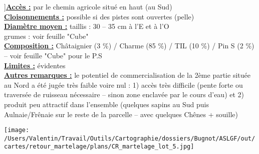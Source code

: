 \documentclass[a4paper,openany]{book}\usepackage[]{graphicx}\usepackage[]{color}
\begin{document}
\begin{multicols}{2}
]\noindent\textbf{\underline{Accès :}} par le chemin agricole situé en haut (au Sud)\vspace{0.1cm} \\\noindent\textbf{\underline{Cloisonnements :}} possible si des pistes sont ouvertes (pelle)\vspace{0.1cm} \\\noindent\textbf{\underline{Diamètre moyen :}} taillis : 30 -- 35 cm à l'E et à l'O \\ grumes : voir feuille "Cube"\vspace{0.1cm} \\\noindent\textbf{\underline{Composition :}} Châtaignier (3 \%) / Charme (85 \%) / TIL (10 \%) / Pin S (2 \%) -- voir feuille "Cube" pour le P.S\vspace{0.1cm} \\\noindent\textbf{\underline{Limites :}} évidentes\vspace{0.1cm} \\\noindent\textbf{\underline{Autres remarques :}} le potentiel de commercialisation de la 2ème partie située au Nord a été jugée très faible voire nul : 1) accès très difficile (pente forte ou traversée de ruisseau nécessaire -- sinon zone enclavée par le cours d'eau) et 2) produit peu attractif dans l'ensemble (quelques sapins au Sud puis Aulnaie/Frênaie sur le reste de la parcelle -- avec quelques Chênes + souille)\vspace{0.1cm} \\\end{multicols}\begin{center}
\texttt{[image: /Users/Valentin/Travail/Outils/Cartographie/dossiers/Bugnot/ASLGF/out/cartes/retour\_martelage/plans/CR\_martelage\_lot\_5.jpg]}
\end{center}\newpage\noindent
\end{document}
